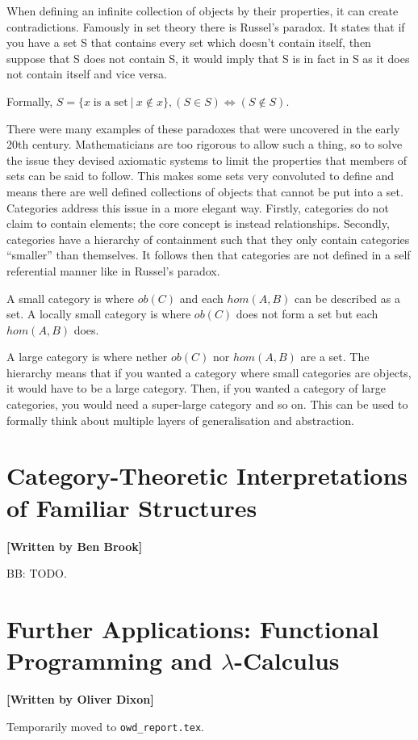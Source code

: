 \documentclass[10pt,a4paper,reqno]{amsart}
\numberwithin{figure}{section}
\begin{document}
When defining an infinite collection of objects by their properties, it can
create contradictions. Famously in set theory there is Russel's paradox.  It
states that if you have a set S that contains every set which doesn't contain
itself, then suppose that S does not contain S, it would imply that S is in fact
in S as it does not contain itself and vice versa.

Formally, $S = \{x\;\text{is a set}\:|\:x\notin x\}, (S\in S) \iff (S\notin S)$.

There were many examples of these paradoxes that were uncovered in the early
20th century. Mathematicians are too rigorous to allow such a thing, so to solve
the issue they devised axiomatic systems to limit the properties that members of
sets can be said to follow.  This makes some sets very convoluted to define and
means there are well defined collections of objects that cannot be put into a
set. Categories address this issue in a more elegant way.  Firstly, categories
do not claim to contain elements; the core concept is instead relationships.
Secondly, categories have a hierarchy of containment such that they only contain
categories ``smaller'' than themselves.  It follows then that categories are not
defined in a self referential manner like in Russel's paradox.

A small category is where $ob(C)$ and each $hom(A,B)$ can be described as a set.
A locally small category is where $ob(C)$ does not form a set but each
$hom(A,B)$ does.

A large category is where nether $ob(C)$ nor $hom(A,B)$ are a set. The hierarchy
means that if you wanted a category where small categories are objects, it would
have to be a large category. Then, if you wanted a category of large categories,
you would need a super-large category and so on. This can be used to formally
think about multiple layers of generalisation and abstraction.
\section{Category-Theoretic %
        Interpretations of Familiar Structures}
\begin{flushright}
        \textbf{[Written by Ben Brook]}
\end{flushright}

\noindent BB: TODO.

\section{Further Applications: %
        Functional Programming and \texorpdfstring{$\lambda$}{Lambda}-Calculus}
\begin{flushright}
        \textbf{[Written by Oliver Dixon]}
\end{flushright}

\noindent Temporarily moved to \texttt{owd\_report.tex}.

\printbibliography[title=Cited Works]
\end{document}

